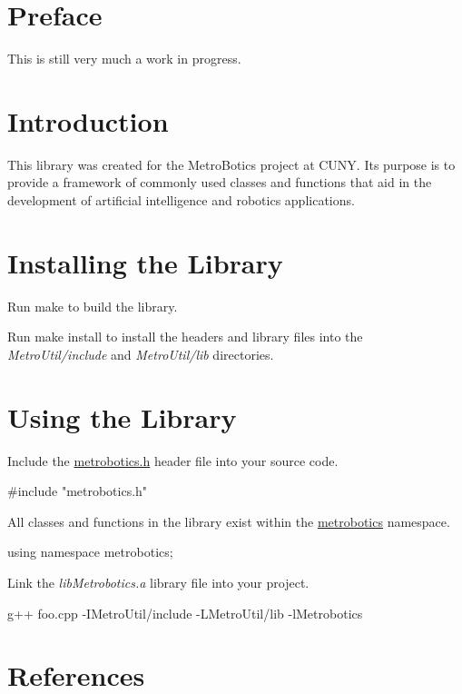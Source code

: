 \hypertarget{index_main_preface}{}\section{\-Preface}\label{index_main_preface}
\-This is still very much a work in progress.\hypertarget{index_main_intro}{}\section{\-Introduction}\label{index_main_intro}
\-This library was created for the \-Metro\-Botics project at \-C\-U\-N\-Y. \-Its purpose is to provide a framework of commonly used classes and functions that aid in the development of artificial intelligence and robotics applications.\hypertarget{index_main_install}{}\section{\-Installing the Library}\label{index_main_install}

\begin{DoxyEnumerate}
\item \-Run {\ttfamily make} to build the library.  
\item \-Run {\ttfamily make} {\ttfamily install} to install the headers and library files into the {\itshape \-Metro\-Util/include\/} and {\itshape \-Metro\-Util/lib\/} directories.  
\end{DoxyEnumerate}\hypertarget{index_main_usage}{}\section{\-Using the Library}\label{index_main_usage}

\begin{DoxyEnumerate}
\item \-Include the \hyperlink{metrobotics_8h}{metrobotics.\-h} header file into your source code. 
\begin{DoxyCode}
                 #include "metrobotics.h"
\end{DoxyCode}
  
\item \-All classes and functions in the library exist within the \hyperlink{namespacemetrobotics}{metrobotics} namespace. 
\begin{DoxyCode}
                 using namespace metrobotics;
\end{DoxyCode}
  
\item \-Link the {\itshape lib\-Metrobotics.\-a\/} library file into your project. 
\begin{DoxyCode}
                 g++ foo.cpp -IMetroUtil/include -LMetroUtil/lib -lMetrobotics
\end{DoxyCode}
  
\end{DoxyEnumerate}\hypertarget{index_main_references}{}\section{\-References}\label{index_main_references}

